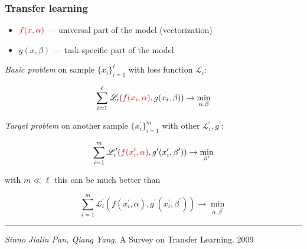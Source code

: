 \documentclass[fullscreen=true, bookmarks=true, hyperref={pdfencoding=unicode}]{beamer}
\begin{document}
\begin{frame}
  \frametitle{Transfer learning}

    \begin{itemize}
      \item ${\color{red}f(x,\alpha)}$ — universal part of the model (vectorization)
      \item $g(x, \beta)$ — task-specific part of the model
    \end{itemize}

    {\it Basic problem} on sample $\{x_i\}_{i=1}^\ell$ with loss function $\mathscr{L}_i$:

    $$\sum\limits_{i=1}^\ell \mathscr{L}_i ({\color{red}f(x_i,\alpha)}, g(x_i, \beta)) \to \min_{\alpha,\beta} $$

    {\it Target problem} on another sample $\{x_i^\prime\}_{i=1}^m$ with other $\mathscr{L}_i^\prime, g^\prime$:

    $$\sum\limits_{i=1}^m \mathscr{L}_i^\prime ({\color{red}f(x_i^\prime,\alpha)}, g^\prime(x_i^\prime , \beta^\prime)) \to \min_{ \beta^\prime} $$

    with $m \ll \ell$ this can be much better than

    $$\sum\limits_{i=1}^m \mathscr{L}_i^\prime (f(x_i^\prime,\alpha), g^\prime(x_i^\prime, \beta^\prime) ) \to \min_{\alpha, \beta^\prime} $$

    \noindent\rule{8cm}{0.4pt}

    {\footnotesize
    {\it Sinno Jialin Pan, Qiang Yang.} A Survey on Transfer Learning. 2009}
\end{frame}
\end{document}
